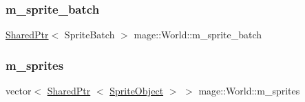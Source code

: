 \hypertarget{classmage_1_1_world_abb5d26cbfbd7b5792a53359b823c9f37}{}\label{classmage_1_1_world_abb5d26cbfbd7b5792a53359b823c9f37} 
\subsubsection{\texorpdfstring{m\+\_\+sprite\+\_\+batch}{m\_sprite\_batch}}
{\footnotesize\ttfamily \hyperlink{namespacemage_a1e01ae66713838a7a67d30e44c67703e}{Shared\+Ptr}$<$ Sprite\+Batch $>$ mage\+::\+World\+::m\+\_\+sprite\+\_\+batch\hspace{0.3cm}{\ttfamily [private]}}

\hypertarget{classmage_1_1_world_a2c769aca9f3394dc0f41473c5cd342a9}{}\label{classmage_1_1_world_a2c769aca9f3394dc0f41473c5cd342a9} 
\subsubsection{\texorpdfstring{m\+\_\+sprites}{m\_sprites}}
{\footnotesize\ttfamily vector$<$ \hyperlink{namespacemage_a1e01ae66713838a7a67d30e44c67703e}{Shared\+Ptr} $<$ \hyperlink{classmage_1_1_sprite_object}{Sprite\+Object} $>$ $>$ mage\+::\+World\+::m\+\_\+sprites\hspace{0.3cm}{\ttfamily [private]}}

